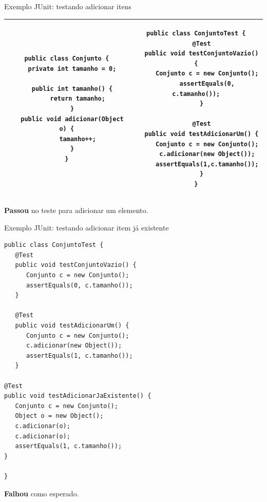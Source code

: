 \documentclass[handout]{beamer}
\begin{document}
\begin{frame}[fragile]{Exemplo JUnit: testando adicionar itens}

\begin{tabular}{|c|c|}
\hline
\begin{minipage}{.45\textwidth}
\begin{lstlisting}[basicstyle=\tiny]
public class Conjunto {
   private int tamanho = 0;
   
   public int tamanho() {
      return tamanho;
   }
   public void adicionar(Object o) {
      tamanho++;
   }
}
\end{lstlisting}
\end{minipage} &
\begin{minipage}{.5\textwidth}
\begin{lstlisting}[basicstyle=\tiny]
public class ConjuntoTest {
   @Test
   public void testConjuntoVazio() {
      Conjunto c = new Conjunto();
      assertEquals(0, c.tamanho());
   }

   @Test
   public void testAdicionarUm() {
      Conjunto c = new Conjunto();
      c.adicionar(new Object());
      assertEquals(1,c.tamanho());
   }
}
\end{lstlisting}
\end{minipage} \\ \hline
\end{tabular}

\vspace{2mm}

\textcolor[rgb]{0,.5,0}{\bf Passou} no teste para adicionar um elemento.

\end{frame}



\begin{frame}[fragile]{Exemplo JUnit: testando adicionar item já existente}

\begin{framed}
\begin{multicols}{2}
\begin{lstlisting}[basicstyle=\tiny]
public class ConjuntoTest {
   @Test
   public void testConjuntoVazio() {
      Conjunto c = new Conjunto();
      assertEquals(0, c.tamanho());
   }

   @Test
   public void testAdicionarUm() {
      Conjunto c = new Conjunto();
      c.adicionar(new Object());
      assertEquals(1, c.tamanho());
   }

@Test
public void testAdicionarJaExistente() {
   Conjunto c = new Conjunto();
   Object o = new Object();
   c.adicionar(o);
   c.adicionar(o);
   assertEquals(1, c.tamanho());
}

}
\end{lstlisting}
\end{multicols}
\end{framed}
\vspace{2mm}

\textcolor[rgb]{.5,0,0}{\bf Falhou} como esperado.

\end{frame}
\end{document}
